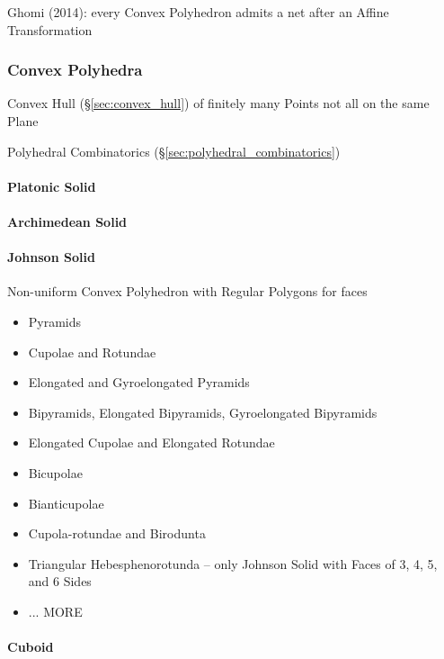 Ghomi (2014): every Convex Polyhedron admits a net after an Affine
Transformation



\subsubsection{Convex Polyhedra}\label{sec:convex_polyhedra}

Convex Hull (\S\ref{sec:convex_hull}) of finitely many Points not all on the
same Plane

\fist Polyhedral Combinatorics (\S\ref{sec:polyhedral_combinatorics})



\paragraph{Platonic Solid}\label{sec:platonic_solid}\hfill

\paragraph{Archimedean Solid}\label{sec:archimedean_solid}\hfill

\paragraph{Johnson Solid}\label{sec:johnson_solid}\hfill

Non-uniform Convex Polyhedron with Regular Polygons for faces

\begin{itemize}
  \item Pyramids
  \item Cupolae and Rotundae
  \item Elongated and Gyroelongated Pyramids
  \item Bipyramids, Elongated Bipyramids, Gyroelongated Bipyramids
  \item Elongated Cupolae and Elongated Rotundae
  \item Bicupolae
  \item Bianticupolae
  \item Cupola-rotundae and Birodunta
  \item Triangular Hebesphenorotunda -- only Johnson Solid with Faces of 3, 4,
    5, and 6 Sides
  \item ... MORE
\end{itemize}



\paragraph{Cuboid}\label{sec:cuboid}\hfill

